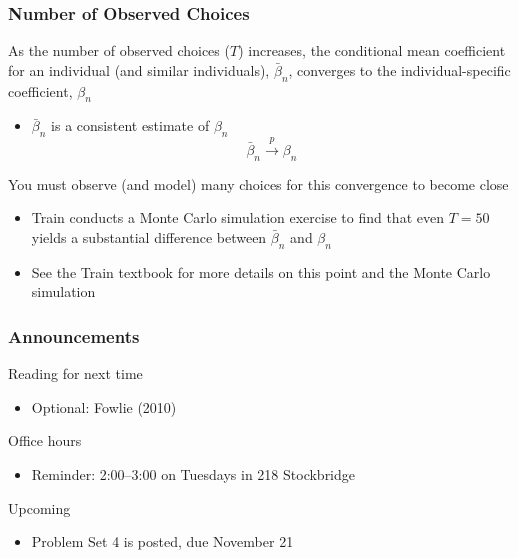 \documentclass{beamer}\usepackage[]{graphicx}\usepackage[]{color}
\begin{document}
\begin{frame}\frametitle{Number of Observed Choices}
    As the number of observed choices ($T$) increases, the conditional mean coefficient for an individual (and similar individuals), $\bar{\beta}_n$, converges to the individual-specific coefficient, $\beta_n$
    \begin{itemize}
    	\item $\bar{\beta}_n$ is a consistent estimate of $\beta_n$
    	$$\bar{\beta}_n \overset{p}{\rightarrow} \beta_n$$
    \end{itemize}
    \vspace{3ex}
    You must observe (and model) many choices for this convergence to become close
    \begin{itemize}
    	\item Train conducts a Monte Carlo simulation exercise to find that even $T = 50$ yields a substantial difference between $\bar{\beta}_n$ and $\beta_n$
    	\item See the Train textbook for more details on this point and the Monte Carlo simulation
    \end{itemize}
\end{frame}

\begin{frame}\frametitle{Announcements}
    Reading for next time
    \begin{itemize}
        \item Optional: Fowlie (2010)
    \end{itemize}
    \vspace{3ex}
    Office hours
    \begin{itemize}
    	\item Reminder: 2:00--3:00 on Tuesdays in 218 Stockbridge
    \end{itemize}
    \vspace{3ex}
    Upcoming
    \begin{itemize}
        \item Problem Set 4 is posted, due November 21
    \end{itemize}
\end{frame}
\end{document}
